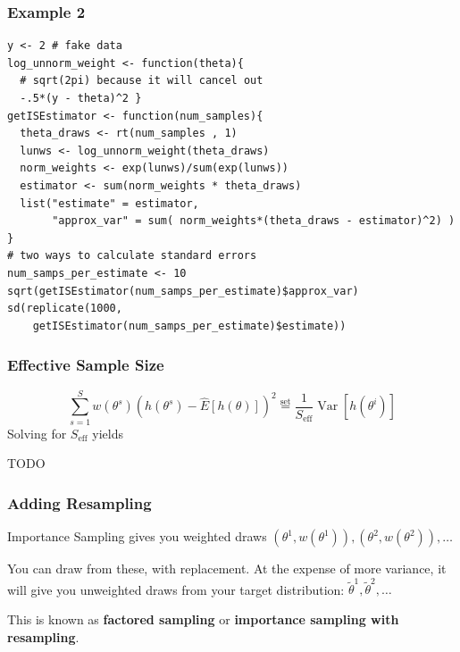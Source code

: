 \documentclass{beamer}
\begin{document}
\begin{frame}[fragile]
\frametitle{Example 2}

\begin{verbatim}
y <- 2 # fake data
log_unnorm_weight <- function(theta){ 
  # sqrt(2pi) because it will cancel out 
  -.5*(y - theta)^2 }
getISEstimator <- function(num_samples){
  theta_draws <- rt(num_samples , 1)
  lunws <- log_unnorm_weight(theta_draws)
  norm_weights <- exp(lunws)/sum(exp(lunws))
  estimator <- sum(norm_weights * theta_draws)
  list("estimate" = estimator, 
       "approx_var" = sum( norm_weights*(theta_draws - estimator)^2) ) }
# two ways to calculate standard errors
num_samps_per_estimate <- 10
sqrt(getISEstimator(num_samps_per_estimate)$approx_var)  
sd(replicate(1000, 
    getISEstimator(num_samps_per_estimate)$estimate)) 
\end{verbatim}


\end{frame}

\begin{frame}[fragile]
\frametitle{Effective Sample Size}


\[
\sum_{s=1}^S w(\theta^s) \left( h(\theta^s) - \hat{E}[h(\theta)]  \right)^2 \overset{\text{set}}{=}  \frac{1}{S_{\text{eff}}} \operatorname{Var}\left[ h(\theta^i) \right]
\]
Solving for $S_{\text{eff}}$ yields

TODO

\end{frame}

\begin{frame}[fragile]
\frametitle{Adding Resampling}

Importance Sampling gives you weighted draws $(\theta^1, w(\theta^1) ), (\theta^2, w(\theta^2) ), \ldots$
\newline

You can draw from these, with replacement. At the expense of more variance, it will give you unweighted draws from your target distribution:
$\tilde{\theta}^1, \tilde{\theta}^2, \ldots $
\newline

This is known as {\bf factored sampling} or {\bf importance sampling with resampling}.


\end{frame}
\end{document}
